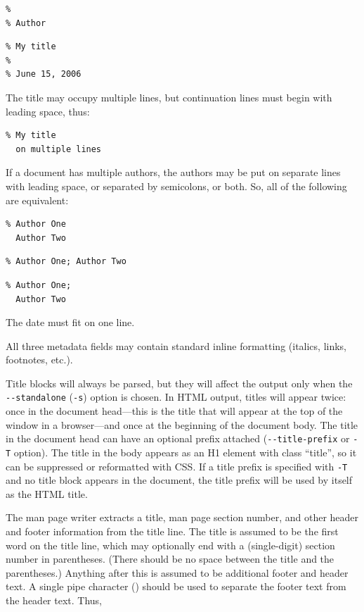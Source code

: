 \documentclass[
]{article}
\begin{document}
\begin{verbatim}
%
% Author
\end{verbatim}

\begin{verbatim}
% My title
%
% June 15, 2006
\end{verbatim}

The title may occupy multiple lines, but continuation lines must begin
with leading space, thus:

\begin{verbatim}
% My title
  on multiple lines
\end{verbatim}

If a document has multiple authors, the authors may be put on separate
lines with leading space, or separated by semicolons, or both. So, all
of the following are equivalent:

\begin{verbatim}
% Author One
  Author Two
\end{verbatim}

\begin{verbatim}
% Author One; Author Two
\end{verbatim}

\begin{verbatim}
% Author One;
  Author Two
\end{verbatim}

The date must fit on one line.

All three metadata fields may contain standard inline formatting
(italics, links, footnotes, etc.).

Title blocks will always be parsed, but they will affect the output only
when the \texttt{-\/-standalone} (\texttt{-s}) option is chosen. In HTML
output, titles will appear twice: once in the document head---this is
the title that will appear at the top of the window in a browser---and
once at the beginning of the document body. The title in the document
head can have an optional prefix attached (\texttt{-\/-title-prefix} or
\texttt{-T} option). The title in the body appears as an H1 element with
class ``title'', so it can be suppressed or reformatted with CSS. If a
title prefix is specified with \texttt{-T} and no title block appears in
the document, the title prefix will be used by itself as the HTML title.

The man page writer extracts a title, man page section number, and other
header and footer information from the title line. The title is assumed
to be the first word on the title line, which may optionally end with a
(single-digit) section number in parentheses. (There should be no space
between the title and the parentheses.) Anything after this is assumed
to be additional footer and header text. A single pipe character
(\texttt{\textbar{}}) should be used to separate the footer text from
the header text. Thus,
\end{document}
